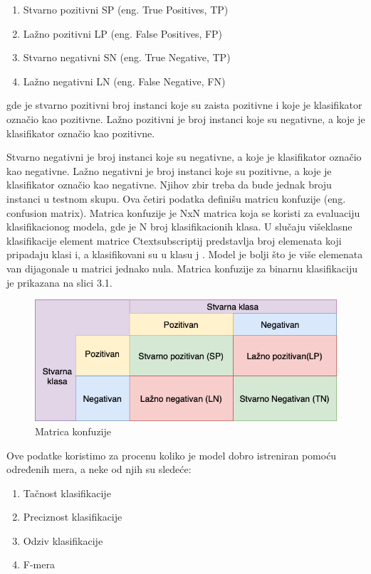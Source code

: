 \documentclass[12pt,oneside]{memoir}
\begin{document}
\begin{enumerate}
\item Stvarno pozitivni SP (eng. True Positives, TP)
\item Lažno pozitivni LP (eng.  False Positives,  FP)
\item Stvarno negativni SN (eng.  True Negative, TP)
\item Lažno negativni LN (eng.  False Negative, FN)
\end{enumerate}


gde je stvarno pozitivni broj instanci koje su zaista pozitivne i koje je klasifikator označio kao pozitivne.  Lažno pozitivni je broj instanci koje su negativne, a koje je klasifikator označio kao pozitivne.  

Stvarno negativni je broj instanci koje su negativne,  a koje je klasifikator označio kao negativne.  Lažno negativni je broj instanci koje su pozitivne, a koje je klasifikator označio kao negativne.  Njihov zbir treba da bude jednak broju instanci u testnom skupu.  Ova četiri podatka definišu matricu konfuzije (eng. confusion matrix).  Matrica konfuzije je NxN matrica koja se koristi za evaluaciju klasifikacionog modela,  gde je N broj klasifikacionih klasa.  U slučaju višeklasne klasifikacije element matrice Ctextsubscript{ij} predstavlja broj elemenata koji pripadaju klasi i, a klasifikovani su u klasu j \cite{MarijaMR}.  Model je bolji što je više elemenata van dijagonale u matrici jednako nula.  Matrica konfuzije za binarnu klasifikaciju je prikazana na slici 3.1.

\begin{figure}[h!]
\centering
\includegraphics[width=.7\textwidth]{images/confusionMatrix.png}
\caption{Matrica konfuzije}
\label{Slika}
\end{figure}

Ove podatke koristimo za procenu koliko je model dobro istreniran pomoću određenih mera, a neke od njih su sledeće:

\begin{enumerate}
\item Tačnost klasifikacije
\item Preciznost klasifikacije
\item Odziv klasifikacije
\item F-mera
\end{enumerate}
\end{document}
